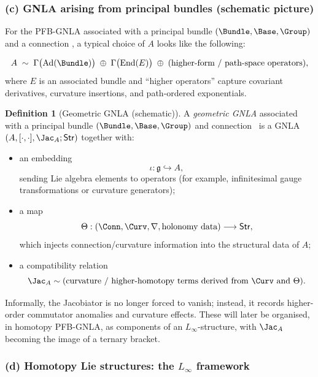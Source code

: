 \documentclass[11pt]{book}
\theoremstyle{plain}
\theoremstyle{definition}
\newtheorem{definition}[theorem]{Definition} \theoremstyle{remark}
\begin{document}
\subsubsection*{(c) GNLA arising from principal bundles (schematic picture)}

For the PFB-GNLA associated with a principal bundle
$(\Bundle,\Base,\Group)$ and a connection \Conn, a typical choice of
$A$ looks like the following:

\[
   A
   \;\sim\;
   \Gamma\bigl(\mathrm{Ad}(\Bundle)\bigr)
   \;\oplus\;
   \Gamma\bigl(\mathrm{End}(E)\bigr)
   \;\oplus\;
   \text{(higher-form / path-space operators)},
\]
where $E$ is an associated bundle and “higher operators” capture
covariant derivatives, curvature insertions, and path-ordered
exponentials.



\begin{definition}[Geometric GNLA (schematic)]
A \emph{geometric GNLA} associated with a principal bundle
  $(\Bundle,\Base,\Group)$ and connection \Conn\ is a GNLA
  $(A,[\cdot,\cdot],\Jac_A;\mathsf{Str})$ together with:
  \begin{itemize}
    \item an embedding
          \[
             \iota:\mathfrak{g}
             \hookrightarrow A,
          \]
          sending Lie algebra elements to operators (for example,
          infinitesimal gauge transformations or curvature generators);
    \item a map
          \[
             \Theta:
               (\Conn,\Curv,
                \nabla,\text{holonomy data})
               \longrightarrow
               \mathsf{Str},
          \]
          which injects connection/curvature information into the
          structural data of $A$;
    \item a compatibility relation
          \[
             \Jac_A
             \sim
             \text{(curvature / higher-homotopy terms derived from }
             \Curv\text{ and }\Theta).
          \]
  \end{itemize}
\end{definition}

Informally, the Jacobiator is no longer forced to vanish; instead, it
records higher-order commutator anomalies and curvature effects. These
will later be organised, in homotopy PFB-GNLA, as components of an
$L_\infty$-structure, with $\Jac_A$ becoming the image of a ternary
bracket.



\subsubsection*{(d) Homotopy Lie structures: the $L_\infty$ framework}
\end{document}
